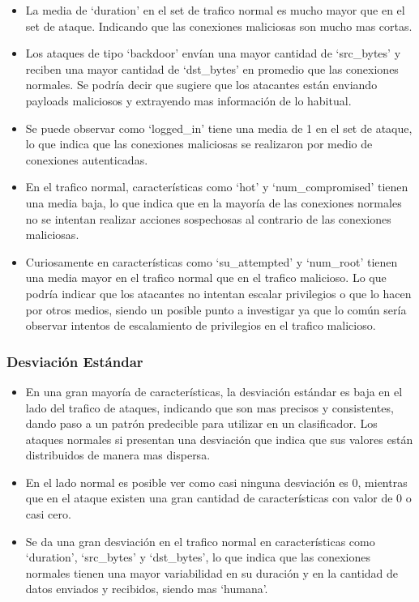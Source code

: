 \documentclass[12pt,a4paper]{article}
\begin{document}
\begin{itemize}
  \item La media de `duration' en el set de trafico normal es mucho mayor que en el set de ataque.
    Indicando que las conexiones maliciosas son mucho mas cortas.
  \item Los ataques de tipo `backdoor' envían una mayor cantidad de `src_bytes' y reciben una mayor cantidad de `dst_bytes' en promedio que las conexiones normales.
    Se podría decir que sugiere que los atacantes están enviando payloads maliciosos y extrayendo mas información de lo habitual.
  \item Se puede observar como `logged_in' tiene una media de 1 en el set de ataque, lo que indica que las conexiones maliciosas se realizaron por medio de conexiones autenticadas.
  \item En el trafico normal, características como `hot' y `num_compromised' tienen una media baja, lo que indica que en la mayoría de las conexiones normales no se intentan realizar acciones sospechosas al contrario de las conexiones maliciosas.
  \item Curiosamente en características como `su_attempted' y `num_root' tienen una media mayor en el trafico normal que en el trafico malicioso.
    Lo que podría indicar que los atacantes no intentan escalar privilegios o que lo hacen por otros medios, siendo un posible punto a investigar ya que lo común sería observar intentos de escalamiento de privilegios en el trafico malicioso.
\end{itemize}

\subsubsection{Desviación Estándar}

\begin{itemize}
  \item En una gran mayoría de características, la desviación estándar es baja en el lado del trafico de ataques, indicando que son mas precisos y consistentes, dando paso a un patrón predecible para utilizar en un clasificador.
    Los ataques normales si presentan una desviación que indica que sus valores están distribuidos de manera mas dispersa.
  \item En el lado normal es posible ver como casi ninguna desviación es 0, mientras que en el ataque existen una gran cantidad de características con valor de 0 o casi cero.
  \item Se da una gran desviación en el trafico normal en características como `duration', `src_bytes' y `dst_bytes', lo que indica que las conexiones normales tienen una mayor variabilidad en su duración y en la cantidad de datos enviados y recibidos, siendo mas `humana'.
\end{itemize}
\end{document}
